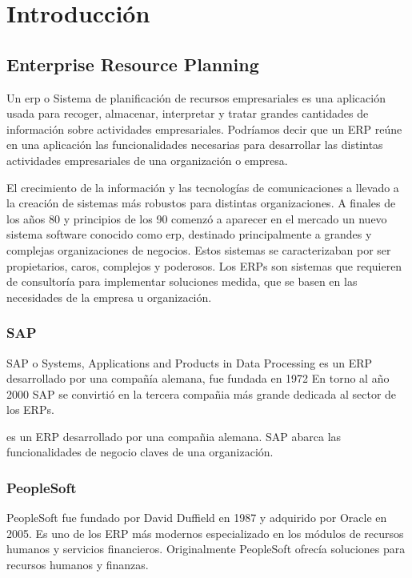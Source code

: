 \chapter{Introducción}


\section[ERP's]{Enterprise Resource Planning}

Un \gls{erp} o Sistema de planificación de recursos empresariales es una aplicación usada para recoger, almacenar,
interpretar y tratar grandes cantidades de información sobre actividades empresariales.
Podríamos decir que un ERP reúne en una aplicación las funcionalidades necesarias para desarrollar las distintas actividades empresariales de una organización o empresa.

El crecimiento de la información y las tecnologías de comunicaciones a llevado a la creación de sistemas más robustos para 
distintas organizaciones. A finales de los años 80 y principios de los 90 comenzó a aparecer en el mercado un nuevo sistema 
software conocido como \acrshort{erp}, destinado principalmente a grandes y complejas organizaciones de negocios. Estos sistemas 
se caracterizaban por ser propietarios, caros, complejos y poderosos.
Los ERPs son sistemas que requieren de consultoría para implementar soluciones medida, que se basen en las necesidades de la empresa u organización. \cite{erp1}


\subsection{SAP}


SAP o  Systems, Applications and Products in Data Processing es un ERP desarrollado por una compañía alemana, fue fundada en 1972
En torno al año 2000 SAP se convirtió en la tercera compañia más grande dedicada al sector de los ERPs.


es un ERP desarrollado por una compañia alemana. SAP abarca las funcionalidades de negocio claves de una organización.

\subsection{PeopleSoft}
PeopleSoft fue fundado por David Duffield en 1987 y adquirido por Oracle en 2005. Es uno de los ERP más modernos especializado en los módulos de recursos humanos y servicios financieros.
Originalmente PeopleSoft ofrecía soluciones para recursos humanos y finanzas.


